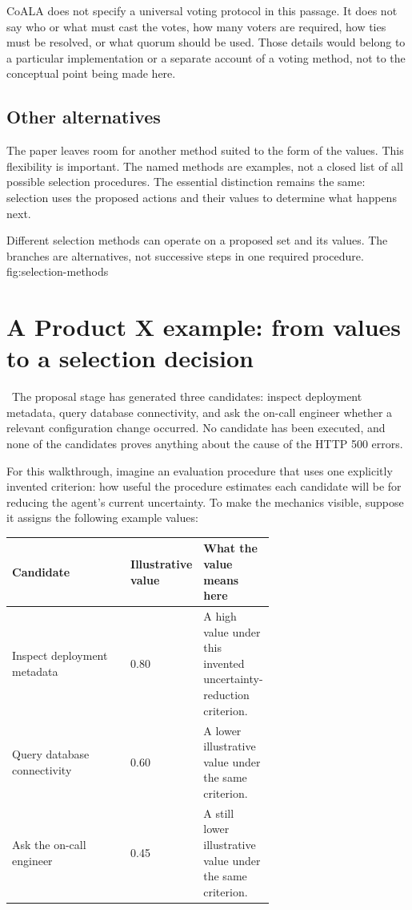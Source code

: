 CoALA does not specify a universal voting protocol in this passage. It does not say who or what must cast the votes, how many voters are required, how ties must be resolved, or what quorum should be used. Those details would belong to a particular implementation or a separate account of a voting method, not to the conceptual point being made here.

\subsection{Other alternatives}

The paper leaves room for another method suited to the form of the values. This flexibility is important. The named methods are examples, not a closed list of all possible selection procedures. The essential distinction remains the same: selection uses the proposed actions and their values to determine what happens next.

  {Different selection methods can operate on a proposed set and its values. The branches are alternatives, not successive steps in one required procedure.}
  {fig:selection-methods}

\section{A Product X example: from values to a selection decision}
\label{sec:productx-evaluation-selection}

\BookExampleLabel\ The proposal stage has generated three candidates: inspect deployment metadata, query database connectivity, and ask the on-call engineer whether a relevant configuration change occurred. No candidate has been executed, and none of the candidates proves anything about the cause of the HTTP 500 errors.

For this walkthrough, imagine an evaluation procedure that uses one explicitly invented criterion: how useful the procedure estimates each candidate will be for reducing the agent's current uncertainty. To make the mechanics visible, suppose it assigns the following example values:

\begin{center}
\begin{tabularx}{\linewidth}{@{}P{0.46\linewidth}P{0.19\linewidth}X@{}}
\toprule
\textbf{Candidate} & \textbf{Illustrative value} & \textbf{What the value means here} \\
\midrule
Inspect deployment metadata & 0.80 & A high value under this invented uncertainty-reduction criterion. \\
Query database connectivity & 0.60 & A lower illustrative value under the same criterion. \\
Ask the on-call engineer & 0.45 & A still lower illustrative value under the same criterion. \\
\bottomrule
\end{tabularx}
\end{center}

